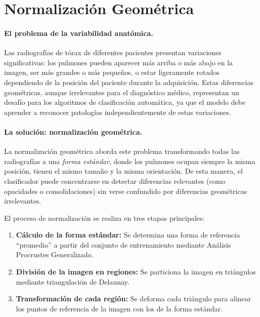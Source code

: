 
\section{Normalización Geométrica}
\label{sec:normalizacion_geometrica}

\paragraph{El problema de la variabilidad anatómica.}
Las radiografías de tórax de diferentes pacientes presentan variaciones significativas: los pulmones pueden aparecer más arriba o más abajo en la imagen, ser más grandes o más pequeños, o estar ligeramente rotados dependiendo de la posición del paciente durante la adquisición. Estas diferencias geométricas, aunque irrelevantes para el diagnóstico médico, representan un desafío para los algoritmos de clasificación automática, ya que el modelo debe aprender a reconocer patologías independientemente de estas variaciones.

\paragraph{La solución: normalización geométrica.}
La normalización geométrica aborda este problema transformando todas las radiografías a una \textit{forma estándar}, donde los pulmones ocupan siempre la misma posición, tienen el mismo tamaño y la misma orientación. De esta manera, el clasificador puede concentrarse en detectar diferencias relevantes (como opacidades o consolidaciones) sin verse confundido por diferencias geométricas irrelevantes.

El proceso de normalización se realiza en tres etapas principales:
\begin{enumerate}
    \item \textbf{Cálculo de la forma estándar:} Se determina una forma de referencia ``promedio'' a partir del conjunto de entrenamiento mediante Análisis Procrustes Generalizado.
    \item \textbf{División de la imagen en regiones:} Se particiona la imagen en triángulos mediante triangulación de Delaunay.
    \item \textbf{Transformación de cada región:} Se deforma cada triángulo para alinear los puntos de referencia de la imagen con los de la forma estándar.
\end{enumerate}

